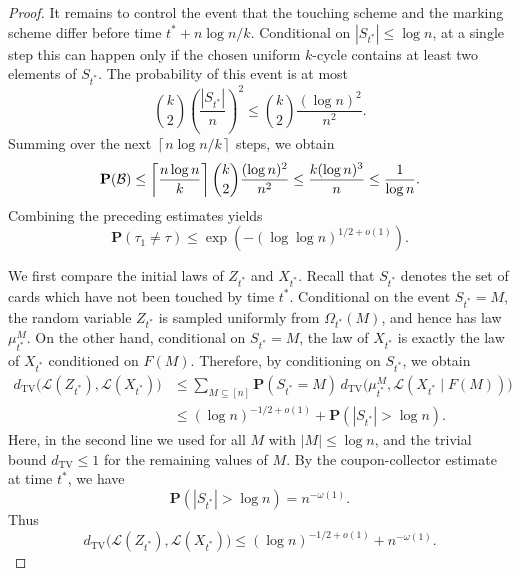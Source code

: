 \begin{proof}
It remains to control the event that the touching scheme and the marking scheme differ before
time $t^*+ n\log n/k$. Conditional on $|S_{t^*}|\leq \log n$, at a single
step this can happen only if the chosen uniform $k$-cycle contains at least two elements of
$S_{t^*}$. The probability of this event is at most
\begin{equation}
    \binom{k}{2}\left(\frac{|S_{t^*}|}{n}\right)^2
    \leq \binom{k}{2}\frac{(\log n)^2}{n^2}.
\end{equation}
Summing over the next $\left\lceil n\log n/k\right\rceil$ steps, we obtain
\begin{equation}\label{eq: prob of B}
\mathbf P(\mathcal B)\leq\left\lceil\frac{n\log n}{k}\right\rceil\binom{k}{2}\frac{(\log n)^2}{n^2} \notag\leq \frac{k(\log n)^3}{n}\leq \frac{1}{\log n}.
\end{equation}
Combining the preceding estimates yields
\begin{equation}
    \mathbf P(\tau_1\neq \tau)
    \leq \exp\left(-(\log\log n)^{1/2+o(1)}\right).
\end{equation}

We first compare the initial laws of \(Z_{t^*}\) and \(X_{t^*}\). Recall that \(S_{t^*}\) denotes the set of cards which have not been touched by time \(t^*\). Conditional on the event \(S_{t^*}=M\), the random variable \(Z_{t^*}\) is sampled uniformly from \(\Omega_{t^*}(M)\), and hence has law \(\mu_{t^*}^M\). On the other hand, conditional on \(S_{t^*}=M\), the law of \(X_{t^*}\) is exactly the law of \(X_{t^*}\) conditioned on \(F(M)\). Therefore, by conditioning on \(S_{t^*}\), we obtain
$$
\begin{aligned}
    d_{\mathrm{TV}}\bigl(\mathcal L(Z_{t^*}),\mathcal L(X_{t^*})\bigr)
    &\leq
    \sum_{M\subseteq[n]}
    \mathbf P(S_{t^*}=M)\,
    d_{\mathrm{TV}}\bigl(\mu_{t^*}^M,\mathcal L(X_{t^*}\mid F(M))\bigr) \\
    &\leq
    (\log n)^{-1/2+o(1)}
    +
    \mathbf P(|S_{t^*}|>\log n).
\end{aligned}
$$
Here, in the second line we used  for all \(M\) with \(|M|\leq \log n\), and the trivial bound \(d_{\mathrm{TV}}\leq 1\) for the remaining values of \(M\). By the coupon-collector estimate at time \(t^*\), we have
$$
\mathbf P(|S_{t^*}|>\log n)=n^{-\omega(1)}.
$$
Thus
$$
d_{\mathrm{TV}}\bigl(\mathcal L(Z_{t^*}),\mathcal L(X_{t^*})\bigr)
\leq
(\log n)^{-1/2+o(1)}+n^{-\omega(1)}.
$$


\end{proof}
